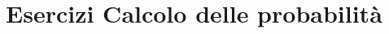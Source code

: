 \documentclass[12pt,a4paper]{article}
\begin{document}
\chapter{Esercizi Calcolo delle probabilit\`a}


\end{document}
